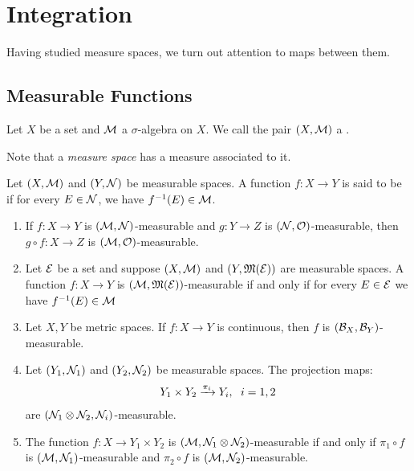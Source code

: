 \chapter{Integration}

Having studied measure spaces, we turn out attention to maps between them.

\section{Measurable Functions}

\begin{definition}
    Let $X$ be a set and $\cM$ a $\sigma$-algebra on $X$. We call the pair $(X,\cM)$ a .
\end{definition}

Note that a \textit{measure space} has a measure associated to it.

\begin{definition}
    Let $(X,\cM)$ and $(Y,\cN)$ be measurable spaces. A function $f:X \rightarrow Y$ is said to be  if for every $E \in \cN$, we have $f^{-1}(E) \in \cM$.
\end{definition}

\begin{proposition}\label{prop:measurable-functs}
    \phantom{a}
    \begin{enumerate}[label = (\arabic*),itemsep=1pt,topsep=3pt]
        \item If $f:X \rightarrow Y$ is $(\cM,\cN)$-measurable and $g:Y \rightarrow Z$ is $(\cN,\cO)$-measurable, then $g \circ f :X \rightarrow Z$ is $(\cM,\cO)$-measurable.
        
        \item Let $\cE$ be a set and suppose $(X,\cM)$ and $(Y,\fM(\cE))$ are measurable spaces. A function $f:X \rightarrow Y$ is $(\cM,\fM(\cE))$-measurable if and only if for every $E \in \cE$ we have $f^{-1}(E) \in \cM$
        
        \item Let $X,Y$ be metric spaces. If $f:X\rightarrow Y$ is continuous, then $f$ is $(\cB_X,\cB_Y)$-measurable.
        
        \item Let $(Y_1,\cN_1)$ and $(Y_2,\cN_2)$ be measurable spaces. The projection maps:
            \begin{equation*}
            \begin{split}
                Y_1 \times Y_2 \xrightarrow{\pi_i}Y_i, \h6 i=1,2
            \end{split}
            \end{equation*}
        are $(\cN_1 \otimes \cN_2,\cN_i)$-measurable.

        \item The function $f:X \rightarrow Y_1 \times Y_2$ is $(\cM,\cN_1 \otimes \cN_2)$-measurable if and only if $\pi_1 \circ f$ is $(\cM,\cN_1)$-measurable and $\pi_2 \circ f$ is $(\cM,\cN_2)$-measurable.
    \end{enumerate}
\end{proposition}

